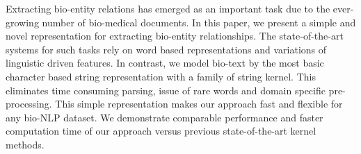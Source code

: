 Extracting bio-entity relations has emerged as an important task due to the ever-growing number of bio-medical documents. In this paper, we present a simple and novel representation for extracting bio-entity relationships. The state-of-the-art systems for such tasks rely on word based representations and variations of linguistic driven features. In contrast, we model bio-text by the most basic character based string representation with a family of string kernel. This eliminates time consuming parsing, issue of rare words and domain specific pre-processing. This simple representation makes our approach fast and flexible for any bio-NLP dataset. We demonstrate comparable performance and faster computation time of our approach versus previous state-of-the-art kernel methods.
